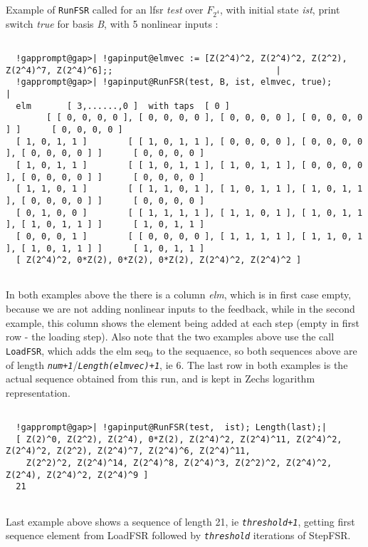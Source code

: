 \documentclass[a4paper,11pt]{report}
\begin{document}
{{{\begin{Verbatim}[commandchars=!@|,fontsize=\small,frame=single,label=Example]
\end{Verbatim}
 Example of \texttt{RunFSR} called for an lfsr \emph{test} over $F_{2^4}$, with initial state \emph{ist}, print switch \emph{true} for basis \emph{B}, with 5 nonlinear inputs : 
\begin{Verbatim}[commandchars=!@|,fontsize=\small,frame=single,label=Example]
  
  !gapprompt@gap>| !gapinput@elmvec := [Z(2^4)^2, Z(2^4)^2, Z(2^2), Z(2^4)^7, Z(2^4)^6];;                                |
  !gapprompt@gap>| !gapinput@RunFSR(test, B, ist, elmvec, true);                         |
  elm 		[ 3,......,0 ]  with taps  [ 0 ]
   		[ [ 0, 0, 0, 0 ], [ 0, 0, 0, 0 ], [ 0, 0, 0, 0 ], [ 0, 0, 0, 0 ] ]		[ 0, 0, 0, 0 ]
  [ 1, 0, 1, 1 ]		[ [ 1, 0, 1, 1 ], [ 0, 0, 0, 0 ], [ 0, 0, 0, 0 ], [ 0, 0, 0, 0 ] ]		[ 0, 0, 0, 0 ]
  [ 1, 0, 1, 1 ]		[ [ 1, 0, 1, 1 ], [ 1, 0, 1, 1 ], [ 0, 0, 0, 0 ], [ 0, 0, 0, 0 ] ]		[ 0, 0, 0, 0 ]
  [ 1, 1, 0, 1 ]		[ [ 1, 1, 0, 1 ], [ 1, 0, 1, 1 ], [ 1, 0, 1, 1 ], [ 0, 0, 0, 0 ] ]		[ 0, 0, 0, 0 ]
  [ 0, 1, 0, 0 ]		[ [ 1, 1, 1, 1 ], [ 1, 1, 0, 1 ], [ 1, 0, 1, 1 ], [ 1, 0, 1, 1 ] ]		[ 1, 0, 1, 1 ]
  [ 0, 0, 0, 1 ]		[ [ 0, 0, 0, 0 ], [ 1, 1, 1, 1 ], [ 1, 1, 0, 1 ], [ 1, 0, 1, 1 ] ]		[ 1, 0, 1, 1 ]
  [ Z(2^4)^2, 0*Z(2), 0*Z(2), 0*Z(2), Z(2^4)^2, Z(2^4)^2 ]
  
\end{Verbatim}
 In both examples above the there is a column \emph{elm}, which is in first case empty, because we are not adding nonlinear inputs to
the feedback, while in the second example, this column shows the element being
added at each step (empty in first row - the loading step). Also note that the
two examples above use the call \texttt{LoadFSR}, which adds the elm seq${{_0}}$ to the sequaence, so both sequences above are of length \mbox{\texttt{\mdseries\slshape num+1}}/\mbox{\texttt{\mdseries\slshape Length(elmvec)+1}}, ie 6. The last row in both examples is the actual sequence obtained from
this run, and is kept in Zechs logarithm representation. 
\begin{Verbatim}[commandchars=!@|,fontsize=\small,frame=single,label=Example]
  
  !gapprompt@gap>| !gapinput@RunFSR(test,  ist); Length(last);|
  [ Z(2)^0, Z(2^2), Z(2^4), 0*Z(2), Z(2^4)^2, Z(2^4)^11, Z(2^4)^2, Z(2^4)^2, Z(2^2), Z(2^4)^7, Z(2^4)^6, Z(2^4)^11, 
    Z(2^2)^2, Z(2^4)^14, Z(2^4)^8, Z(2^4)^3, Z(2^2)^2, Z(2^4)^2, Z(2^4), Z(2^4)^2, Z(2^4)^9 ]
  21
  
\end{Verbatim}
 Last example above shows a sequence of length 21, ie \mbox{\texttt{\mdseries\slshape threshold+1}}, getting first sequence element from LoadFSR followed by \mbox{\texttt{\mdseries\slshape threshold}} iterations of StepFSR. }

}}
\end{document}
